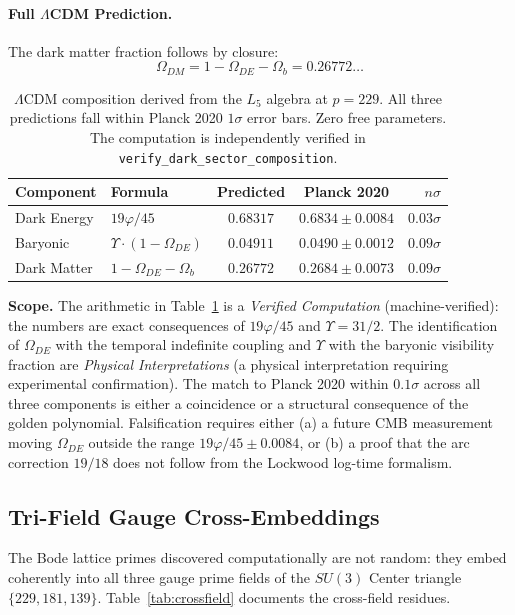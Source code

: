 \paragraph{Full $\Lambda$CDM Prediction.}
The dark matter fraction follows by closure:
\begin{equation}\label{eq:dark_matter}
    \Omega_{DM} = 1 - \Omega_{DE} - \Omega_b = 0.26772\ldots
\end{equation}

\begin{table}[ht]
\centering
\renewcommand{\arraystretch}{1.3}
\begin{tabular}{@{}llccr@{}}
\toprule
\textbf{Component} & \textbf{Formula} & \textbf{Predicted} & \textbf{Planck 2020} & \textbf{$n\sigma$} \\
\midrule
Dark Energy & $19\varphi/45$ & $0.68317$ & $0.6834 \pm 0.0084$ & $0.03\sigma$ \\
Baryonic & $\Upsilon \cdot (1 - \Omega_{DE})$ & $0.04911$ & $0.0490 \pm 0.0012$ & $0.09\sigma$ \\
Dark Matter & $1 - \Omega_{DE} - \Omega_b$ & $0.26772$ & $0.2684 \pm 0.0073$ & $0.09\sigma$ \\
\bottomrule
\end{tabular}
\caption{$\Lambda$CDM composition derived from the $L_5$ algebra at $p = 229$. All three predictions fall within Planck 2020 $1\sigma$ error bars. Zero free parameters. The computation is independently verified in \texttt{verify\_dark\_sector\_composition}.}
\label{tab:dark_sector}
\end{table}

\textbf{Scope.} The arithmetic in Table~\ref{tab:dark_sector} is a \emph{Verified Computation} (machine-verified): the numbers are exact consequences of $19\varphi/45$ and $\Upsilon = 31/2$. The identification of $\Omega_{DE}$ with the temporal indefinite coupling and $\Upsilon$ with the baryonic visibility fraction are \emph{Physical Interpretations} (a physical interpretation requiring experimental confirmation). The match to Planck 2020 within $0.1\sigma$ across all three components is either a coincidence or a structural consequence of the golden polynomial. Falsification requires either (a) a future CMB measurement moving $\Omega_{DE}$ outside the range $19\varphi/45 \pm 0.0084$, or (b) a proof that the arc correction $19/18$ does not follow from the Lockwood log-time formalism.

\subsection{Tri-Field Gauge Cross-Embeddings}
The Bode lattice primes discovered computationally are not random: they embed coherently into all three gauge prime fields of the $SU(3)$ Center triangle $\{229, 181, 139\}$. Table~\ref{tab:crossfield} documents the cross-field residues.

